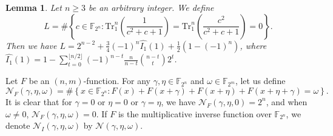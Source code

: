 \documentclass{article}
\newcommand{\F}{\mathbb{F}}
\newcommand{\0}{\textbf{0}}
\newcommand{\1}{\textbf{1}}
\theoremstyle{plain}
\newtheorem{lemma}{Lemma}
\theoremstyle{nonumberplain}
\begin{document}



\begin{lemma}\cite{tang2022invfunc}\label{L:SumInv00}
Let $n\geq 3$ be an arbitrary integer. We define
$$L=\#\left\{c\in\F_{2^n} : \mathrm{Tr}_1^n\left(\frac{1}{c^2+c+1}\right)=\mathrm{Tr}_1^n\left(\frac{c^2}{c^2+c+1}\right)=0\right\}.$$
Then we have $L=2^{n-2}+\frac{3}{4}(-1)^n\widehat{I_1}(1)+\frac{1}{2}\left(1-(-1)^n\right)$, where $ \widehat{I_1}(1)=1-\sum_{t=0}^{\lfloor n/2\rfloor}(-1)^{n-t}\frac{n}{n-t}{{n-t}\choose {t}}2^t $.
\end{lemma}

Let $F$ be an $(n,m)$-function. For any $\gamma,\eta\in\F_{2^n}$ and
$\omega\in\F_{2^m}$, let us define
\begin{equation}
\label{2nddrivative}
\mathcal{N}_F(\gamma,\eta,\omega)=\#\left\{x\in\F_{2^n} : F(x)+F(x+\gamma)+F(x+\eta)+F(x+\eta+\gamma)=\omega\right\}.
\end{equation}
It is clear that for $\gamma=0$ or $\eta=0$ or $\gamma=\eta$, we have $\mathcal{N}_F(\gamma,\eta,0)=2^n$, and when $\omega\neq 0$, $\mathcal{N}_F(\gamma,\eta,\omega)=0$. If $F$ is the multiplicative inverse function over $\mathbb F_{2^n}$, we denote $\mathcal{N}_I(\gamma,\eta,\omega)$ by $\mathcal{N}(\gamma,\eta,\omega)$.
\end{document}
